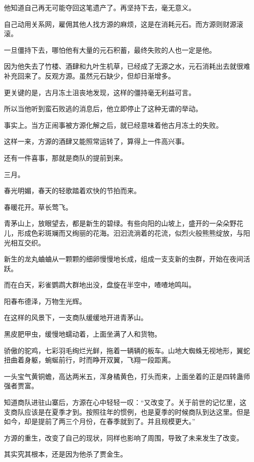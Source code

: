 \begin{this_body}
他知道自己再无可能夺回这笔遗产了。再坚持下去，毫无意义。

自己动用关系网，雇佣其他人找方源的麻烦，这是在消耗元石。而方源则财源滚滚。

一旦僵持下去，哪怕他有大量的元石积蓄，最终失败的人也一定是他。

因为他失去了竹楼、酒肆和九叶生机草，已经成了无源之水，元石消耗出去就很难补充回来了。反观方源。虽然元石缺少，但却日渐增多。

更关键的是，古月冻土沮丧地发现，这样的僵持毫无利益可言。

所以当他听到蛮石败逃的消息后，他立即停止了这种无谓的举动。

事实上。当方正闹事被方源化解之后，就已经意味着他古月冻土的失败。

这样一来，方源的酒肆又能照常运转了，算得上一件高兴事。

还有一件喜事，那就是商队的提前到来。

三月。

春光明媚，春天的轻歌踏着欢快的节拍而来。

春暖花开。草长莺飞。

青茅山上，放眼望去，都是新生的碧绿。有些向阳的山坡上，盛开的一朵朵野花儿，形成色彩斑斓而又绚丽的花海。汩汩流淌着的花流，似烈火般熊熊绽放，与阳光相互交织。

新生的龙丸蛐蛐从一颗颗的细卵慢慢地长成，组成一支支新的虫群，开始在夜间活跃。

而在白天，彩雀鹦鹉大群地出没，盘旋在半空中，喳喳地鸣叫。

阳春布德泽，万物生光辉。

在这样的风景下，一支商队缓缓地开进青茅山。

黑皮肥甲虫，缓慢地蠕动着，上面坐满了人和货物。

骄傲的驼鸡，七彩羽毛绚烂光鲜，拖着一辆辆的板车。山地大蜘蛛无视地形，翼蛇扭曲着身躯，蜿蜒前行，时而睁开双翼，飞翔一段距离。

一头宝气黄铜蟾，高达两米五，浑身橘黄色，打头而来，上面坐着的正是四转蛊师强者贾富。

知道商队进驻山寨后，方源在心中轻轻一叹：“又改变了。关于前世的记忆里，这支商队应该是在夏季才到。按照往年的惯例，也是夏季的时候商队到达这里。但是如今，却是提前了两三个月份，在春季就到了。并且规模更大。”

方源的重生，改变了自己的现状，同样也影响了周围，导致了未来发生了改变。

其实究其根本，还是因为他杀了贾金生。


\end{this_body}
